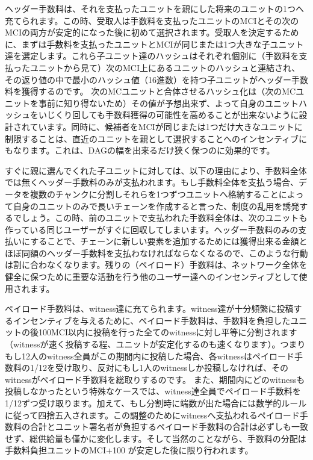 \documentclass[a4paper, dvipdfmx]{jsarticle}
\begin{document}
ヘッダー手数料は、それを支払ったユニットを親にした将来のユニットの1つへ充てられます。この時、受取人は手数料を支払ったユニットのMCIとその次のMCIの両方が安定的になった後に初めて選択されます。受取人を決定するために、まずは手数料を支払ったユニットとMCIが同じまたは1つ大きな子ユニット達を選定します。これら子ユニット達のハッシュはそれぞれ個別に（手数料を支払ったユニットから見て）次のMCI上にあるユニットのハッシュと連結され、その返り値の中で最小のハッシュ値（16進数）を持つ子ユニットがヘッダー手数料を獲得するのです。 次のMCユニットと合体させるハッシュ化は（次のMCユニットを事前に知り得ないため）その値が予想出来ず、よって自身のユニットハッシュをいじくり回しても手数料獲得の可能性を高めることが出来ないように設計されています。同時に、候補者をMCIが同じまたは1つだけ大きなユニットに制限することは、直近のユニットを親として選択することへのインセンティブにもなります。これは、DAGの幅を出来るだけ狭く保つのに効果的です。

すぐに親に選んでくれた子ユニットに対しては、以下の理由により、手数料全体では無くヘッダー手数料のみが支払われます。もし手数料全体を支払う場合、データを複数のチャンクに分割しそれらを1つずつユニットへ格納することによって自身のユニットのみで長いチェーンを作成すると言った、制度の乱用を誘発するでしょう。この時、前のユニットで支払われた手数料全体は、次のユニットも作っている同じユーザーがすぐに回収してしまいます。ヘッダー手数料のみの支払いにすることで、チェーンに新しい要素を追加するためには獲得出来る金額とほぼ同額のヘッダー手数料を支払わなければならなくなるので、このような行動は割に合わなくなります。残りの（ペイロード）手数料は、ネットワーク全体を健全に保つために重要な活動を行う他のユーザー達へのインセンティブとして使用されます。

ペイロード手数料は、witness達に充てられます。witness達が十分頻繁に投稿するインセンティブを与えるために、ペイロード手数料は、手数料を負担したユニットの後100MCI以内に投稿を行った全てのwitnessに対し平等に分割されます（witnessが速く投稿する程、ユニットが安定化するのも速くなります）。つまりもし12人のwitness全員がこの期間内に投稿した場合、各witnessはペイロード手数料の1/12を受け取り、反対にもし1人のwitnessしか投稿しなければ、そのwitnessがペイロード手数料を総取りするのです。 また、期間内にどのwitnessも投稿しなかったという特殊なケースでは、witness達全員でペイロード手数料を1/12ずつ受け取ります。加えて、もし分割時に端数が出た場合には数学的ルールに従って四捨五入されます。この調整のためにwitnessへ支払われるペイロード手数料の合計とユニット署名者が負担するペイロード手数料の合計は必ずしも一致せず、総供給量も僅かに変化します。そして当然のことながら、手数料の分配は 手数料負担ユニットのMCI+100 が安定した後に限り行われます。
\end{document}
